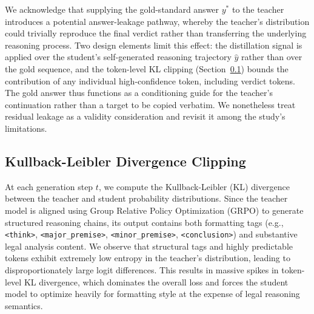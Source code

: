 We acknowledge that supplying the gold-standard answer $y^*$ to the teacher introduces a potential answer-leakage pathway, whereby the teacher's distribution could trivially reproduce the final verdict rather than transferring the underlying reasoning process. Two design elements limit this effect: the distillation signal is applied over the student's self-generated reasoning trajectory $\hat{y}$ rather than over the gold sequence, and the token-level KL clipping (Section~\ref{subsec:kl-clipping}) bounds the contribution of any individual high-confidence token, including verdict tokens. The gold answer thus functions as a conditioning guide for the teacher's continuation rather than a target to be copied verbatim. We nonetheless treat residual leakage as a validity consideration and revisit it among the study's limitations.

\subsection{Kullback-Leibler Divergence Clipping}
\label{subsec:kl-clipping}

At each generation step $t$, we compute the Kullback-Leibler (KL) divergence between the teacher and student probability distributions. Since the teacher model is aligned using Group Relative Policy Optimization (GRPO) to generate structured reasoning chains, its output contains both formatting tags (e.g., \texttt{<think>}, \texttt{<major\_premise>}, \texttt{<minor\_premise>}, \texttt{<conclusion>}) and substantive legal analysis content. We observe that structural tags and highly predictable tokens exhibit extremely low entropy in the teacher's distribution, leading to disproportionately large logit differences. This results in massive spikes in token-level KL divergence, which dominates the overall loss and forces the student model to optimize heavily for formatting style at the expense of legal reasoning semantics.

